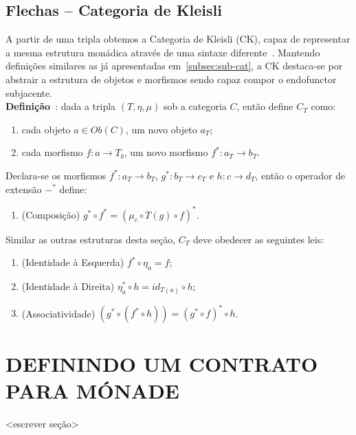 \documentclass[10pt, conference]{IEEEtran}
\begin{document}
\subsection{Flechas -- Categoria de Kleisli}

A partir de uma tripla obtemos a Categoria de Kleisli (CK), capaz de representar a mesma estrutura monádica através de uma sintaxe diferente~\cite{hill1994introduction}. Mantendo definições similares as já apresentadas em~\ref{subsec:sub-cat}, a CK destaca-se por abstrair a estrutura de objetos e morfismos sendo capaz compor o endofunctor subjacente.\\

\textbf{Definição}~\cite{maclane1971mat, pedicchio2004categorical, hill1994introduction}: dada a tripla $(T, \eta, \mu)$ sob a categoria $C$, então define $C_T$ como:

\begin{enumerate}[label=(\alph*), leftmargin=3em, topsep = 0pt, itemsep = 1ex, partopsep = 1ex, parsep = 1ex]
	\item cada objeto $a \in Ob(C)$, um novo objeto $a_T$;
	\item cada morfismo $f: a \rightarrow T_b$, um novo morfismo ${f^*: a_T \rightarrow b_T}$.
\end{enumerate}

\bigskip

Declara-se os morfismos ${f^*: a_T \rightarrow b_T}$, $g^*: b_T \rightarrow c_T$ e ${h: c \rightarrow d_T}$, então o operador de extensão $-^*$ define:

\begin{enumerate}[label={}, leftmargin = 2em, topsep = 0pt, itemsep = 1ex,partopsep = 1ex, parsep = 1ex]
	\item (Composição) $g^* \circ f^* = (\mu_c \circ T(g) \circ f)^*$.
\end{enumerate}

\bigskip

Similar as outras estruturas desta seção, $C_T$ deve obedecer as seguintes leis:

\begin{enumerate}[label={}, leftmargin = 2em, topsep = 0pt, itemsep = 1ex,partopsep = 1ex, parsep = 1ex]
	\item (Identidade à Esquerda) $f^* \circ \eta_a = f$;
	\item (Identidade à Direita) $\eta^*_a \circ h = id_{T(a)} \circ h$;
	\item (Associatividade) $(g^* \circ (f^* \circ h)) = (g^* \circ f)^* \circ h$.
\end{enumerate}

\section{DEFININDO UM CONTRATO PARA MÓNADE}

<escrever seção>



\end{document}
